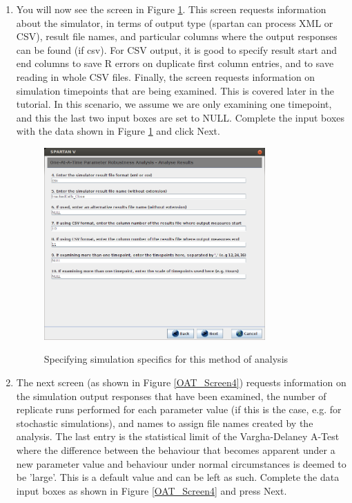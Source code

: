 \documentclass[a4paper,11pt]{article}
\begin{document}
\begin{enumerate}
\item You will now see the screen in Figure \ref{OAT_Screen3}. This screen requests information about the simulator, in terms of output type (spartan can process XML or CSV), result file names, and particular columns where the output responses can be found (if csv). For CSV output, it is good to specify result start and end columns to save R errors on duplicate first column entries, and to save reading in whole CSV files. Finally, the screen requests information on simulation timepoints that are being examined. This is covered later in the tutorial. In this scenario, we assume we are only examining one timepoint, and this the last two input boxes are set to NULL. Complete the input boxes with the data shown in Figure \ref{OAT_Screen3} and click Next.

\begin{figure}
\centering
    \includegraphics[width=0.8\textwidth]{SpartanV_OAT3.png}\\ \noindent
    \caption{Specifying simulation specifics for this method of analysis}
    \label{OAT_Screen3}
    \newpage 
\end{figure}

\item The next screen (as shown in Figure \ref{OAT_Screen4}) requests information on the simulation output responses that have been examined, the number of replicate runs performed for each parameter value (if this is the case, e.g. for stochastic simulations), and names to assign file names created by the analysis. The last entry is the statistical limit of the Vargha-Delaney A-Test where the difference between the behaviour that becomes apparent under a new parameter value and behaviour under normal circumstances is deemed to be 'large'. This is a default value and can be left as such. Complete the data input boxes as shown in Figure \ref{OAT_Screen4} and  press Next.


\end{enumerate}
\end{document}
